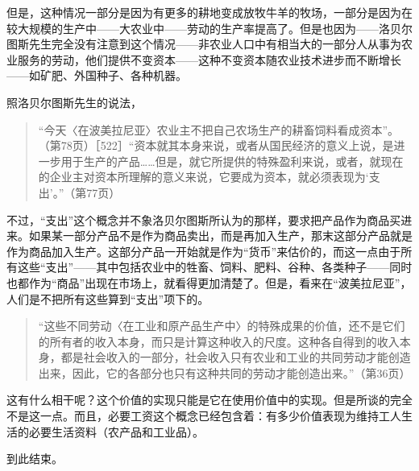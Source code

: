 但是，这种情况一部分是因为有更多的耕地变成放牧牛羊的牧场，一部分是因为在较大规模的生产中——大农业中——劳动的生产率提高了。但是也因为——洛贝尔图斯先生完全没有注意到这个情况——非农业人口中有相当大的一部分人从事为农业服务的劳动，他们提供不变资本——这种不变资本随农业技术进步而不断增长——如矿肥、外国种子、各种机器。

照洛贝尔图斯先生的说法，

\begin{quote}{“今天〈在波美拉尼亚〉农业主不把自己农场生产的耕畜饲料看成资本”。（第78页）［522］“资本就其本身来说，或者从国民经济的意义上说，是进一步用于生产的产品……但是，就它所提供的特殊盈利来说，或者，就现在的企业主对资本所理解的意义来说，它要成为资本，就必须表现为‘支出’。”（第77页）}\end{quote}

不过，“支出”这个概念并不象洛贝尔图斯所认为的那样，要求把产品作为商品买进来。如果某一部分产品不是作为商品卖出，而是再加入生产，那末这部分产品就是作为商品加入生产。这部分产品一开始就是作为“货币”来估价的，而这一点由于所有这些“支出”——其中包括农业中的牲畜、饲料、肥料、谷种、各类种子——同时也都作为“商品”出现在市场上，就看得更加清楚了。但是，看来在“波美拉尼亚”，人们是不把所有这些算到“支出”项下的。

\begin{quote}{“这些不同劳动〈在工业和原产品生产中〉的特殊成果的价值，还不是它们的所有者的收入本身，而只是计算这种收入的尺度。这种各自得到的收入本身，都是社会收入的一部分，社会收入只有农业和工业的共同劳动才能创造出来，因此，它的各部分也只有这种共同的劳动才能创造出来。”（第36页）}\end{quote}

这有什么相干呢？这个价值的实现只能是它在使用价值中的实现。但是所谈的完全不是这一点。而且，必要工资这个概念已经包含着：有多少价值表现为维持工人生活的必要生活资料（农产品和工业品）。

到此结束。


